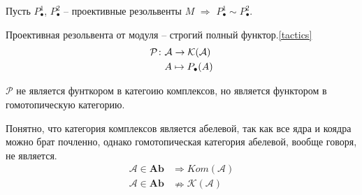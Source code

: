 \documentclass[../main.tex]{subfiles}
\begin{document}
\begin{to_con}
Пусть $P^1_\bullet$, $P^2_\bullet$ -- проективные резольвенты $M$ $\Rightarrow$ $P^1_\bullet \sim P^2_\bullet$. 
\end{to_con}
\begin{to_con}
Проективная резольвента от модуля -- строгий полный функтор.\ref{tactics}
    \begin{align*}
        \mathcal{P}\colon&\mathcal{A} \to\mathcal{K(A)}\\
         &A \mapsto P_\bullet(A)
    \end{align*}
\end{to_con}
\begin{to_com}
$\mathcal{P}$ не является фунткором в категоию комплексов, но является функтором в гомотопическую категорию.
\end{to_com}
\begin{to_com}
Понятно, что категория комплексов является абелевой, так как все ядра и коядра можно брат почленно, однако гомотопическая категория абелевой, вообще говоря, не является.
\begin{align*}
    \mathcal{A} \in \mathbf{Ab}&\Rightarrow Kom\mathcal{(A)}\\
    \mathcal{A} \in \mathbf{Ab}&\nRightarrow \mathcal{K(A)}
\end{align*}
\end{to_com}
\end{document}
